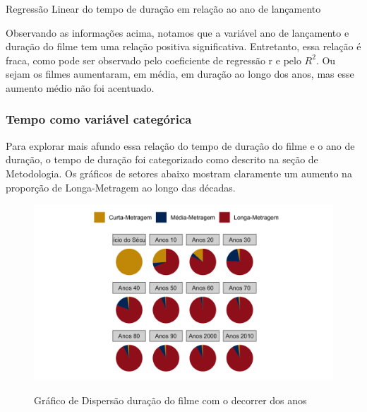 \documentclass[a4paper, 12pt]{article} %
\begin{document}
\begin{quadro}[H]
\centering
\caption{Regressão Linear do tempo de duração em relação ao ano de lançamento}
\label{R-Q-Teste-1}
\vspace{0.1cm}
\end{quadro}

Observando as informações acima, notamos que a variável ano de lançamento e duração do filme tem uma relação positiva significativa. Entretanto, essa relação é fraca, como pode ser observado pelo coeficiente de regressão r e pelo $ R^2$. Ou sejam os filmes aumentaram, em média, em duração ao longo dos anos, mas esse aumento médio não foi acentuado. 

\subsubsection{Tempo como variável categórica}

Para explorar mais afundo essa relação do tempo de duração do filme e o ano de duração, o tempo de duração foi categorizado como descrito na seção de Metodologia. Os gráficos de setores abaixo mostram claramente um aumento na proporção de Longa-Metragem ao longo das décadas. 


\begin{figure}[H]
    \centering
    \caption{Gráfico de Dispersão duração do filme com o decorrer dos anos}
    \includegraphics[scale=0.25]{Fig_Setores_Decada_Duracao.png}
    \label{fig:my_label}
\end{figure}
\end{document}
